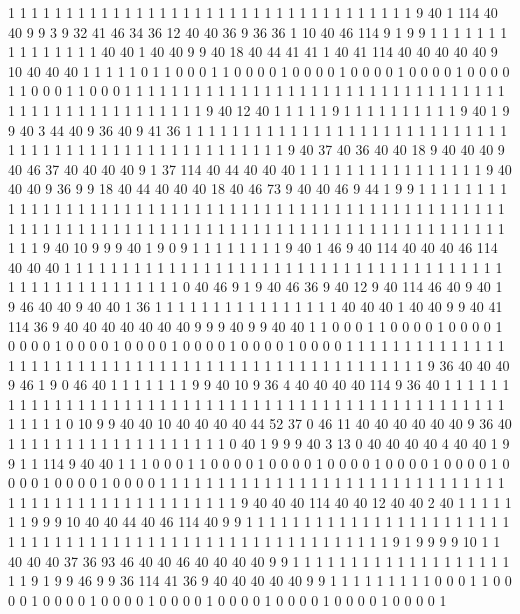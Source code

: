 1 1 1 1 1 1 1 1 1 1 1 1 1 1 1 1 1 1 1 1
1 1 1 1 1 1 1 1 1 1 1 1 1 1 1 9 40 1 114 40
40 9 9 3 9 32 41 46 34 36 12 40 40 36 9 36 36 1 10 40
46 114 9 1 9 9 1 1 1 1 1 1 1 1 1 1 1 1 1 1
1 40 40 1 40 40 9 9 40 18 40 44 41 41 1 40 41 114 40 40
40 40 40 9 10 40 40 40 1 1 1 1 1 0 1 1 0 0 0 1
1 0 0 0 0 1 0 0 0 0 1 0 0 0 0 1 0 0 0 0
1 0 0 0 0 1 1 0 0 0 1 1 0 0 0 1 1 1 1 1
1 1 1 1 1 1 1 1 1 1 1 1 1 1 1 1 1 1 1 1
1 1 1 1 1 1 1 1 1 1 1 1 1 1 1 1 1 1 1 1
1 1 1 1 1 9 40 12 40 1 1 1 1 1 9 1 1 1 1 1
1 1 1 1 1 9 40 1 9 9 40 3 44 40 9 36 40 9 41 36
1 1 1 1 1 1 1 1 1 1 1 1 1 1 1 1 1 1 1 1
1 1 1 1 1 1 1 1 1 1 1 1 1 1 1 1 1 1 1 1
1 1 1 1 1 1 1 1 1 1 1 1 9 40 37 40 36 40 40 18
9 40 40 40 9 40 46 37 40 40 40 40 9 1 37 114 40 44 40 40
40 1 1 1 1 1 1 1 1 1 1 1 1 1 1 1 1 9 40 40
40 9 36 9 9 18 40 44 40 40 40 18 40 46 73 9 40 40 46 9
44 1 9 9 1 1 1 1 1 1 1 1 1 1 1 1 1 1 1 1
1 1 1 1 1 1 1 1 1 1 1 1 1 1 1 1 1 1 1 1
1 1 1 1 1 1 1 1 1 1 1 1 1 1 1 1 1 1 1 1
1 1 1 1 1 1 1 1 1 1 1 1 1 1 1 1 1 1 1 1
1 1 1 1 1 1 1 1 1 1 1 1 1 1 1 1 1 1 1 1
1 9 40 10 9 9 9 40 1 9 0 9 1 1 1 1 1 1 1 1
9 40 1 46 9 40 114 40 40 40 46 114 40 40 40 1 1 1 1 1
1 1 1 1 1 1 1 1 1 1 1 1 1 1 1 1 1 1 1 1
1 1 1 1 1 1 1 1 1 1 1 1 1 1 1 1 1 1 1 1
1 1 1 1 1 1 1 1 0 40 46 9 1 9 40 46 36 9 40 12
9 40 114 46 40 9 40 1 9 46 40 40 9 40 40 1 36 1 1 1
1 1 1 1 1 1 1 1 1 1 1 1 1 40 40 40 1 40 40 9
9 40 41 114 36 9 40 40 40 40 40 40 40 9 9 9 40 9 9 40
40 1 1 0 0 0 1 1 0 0 0 0 1 0 0 0 0 1 0 0
0 0 1 0 0 0 0 1 0 0 0 0 1 0 0 0 0 1 0 0
0 0 1 0 0 0 0 1 1 1 1 1 1 1 1 1 1 1 1 1
1 1 1 1 1 1 1 1 1 1 1 1 1 1 1 1 1 1 1 1
1 1 1 1 1 1 1 1 1 1 1 1 1 1 1 1 1 9 36 40
40 40 9 46 1 9 0 46 40 1 1 1 1 1 1 1 9 9 40 10
9 36 4 40 40 40 40 114 9 36 40 1 1 1 1 1 1 1 1 1
1 1 1 1 1 1 1 1 1 1 1 1 1 1 1 1 1 1 1 1
1 1 1 1 1 1 1 1 1 1 1 1 1 1 1 1 1 1 1 1
1 1 1 1 1 0 10 9 9 40 40 10 40 40 40 40 44 52 37 0
46 11 40 40 40 40 40 40 9 36 40 1 1 1 1 1 1 1 1 1
1 1 1 1 1 1 1 1 1 1 0 40 1 9 9 9 40 3 13 0
40 40 40 40 4 40 40 1 9 9 1 1 114 9 40 40 1 1 1 0
0 0 1 1 0 0 0 0 1 0 0 0 0 1 0 0 0 0 1 0
0 0 0 1 0 0 0 0 1 0 0 0 0 1 0 0 0 0 1 0
0 0 0 1 1 1 1 1 1 1 1 1 1 1 1 1 1 1 1 1
1 1 1 1 1 1 1 1 1 1 1 1 1 1 1 1 1 1 1 1
1 1 1 1 1 1 1 1 1 1 1 1 1 9 40 40 40 114 40 40
12 40 40 2 40 1 1 1 1 1 1 1 9 9 9 10 40 40 44 40
46 114 40 9 9 1 1 1 1 1 1 1 1 1 1 1 1 1 1 1
1 1 1 1 1 1 1 1 1 1 1 1 1 1 1 1 1 1 1 1
1 1 1 1 1 1 1 1 1 1 1 1 1 1 1 1 1 1 1 1
1 9 1 9 9 9 9 10 1 1 40 40 40 37 36 93 46 40 40 46
40 40 40 40 9 9 1 1 1 1 1 1 1 1 1 1 1 1 1 1
1 1 1 1 1 1 1 9 1 9 9 46 9 9 36 114 41 36 9 40
40 40 40 40 9 9 1 1 1 1 1 1 1 1 1 0 0 0 1 1
0 0 0 0 1 0 0 0 0 1 0 0 0 0 1 0 0 0 0 1
0 0 0 0 1 0 0 0 0 1 0 0 0 0 1 0 0 0 0 1
